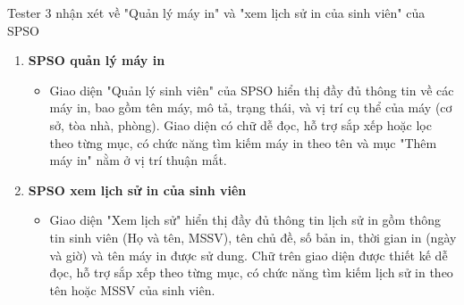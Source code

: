 \begin{itemize}
\begin{enumerate}
  \end{enumerate}
  Tester 3 nhận xét về "Quản lý máy in" và "xem lịch sử in của sinh viên" của SPSO \\
  \begin{enumerate}
      \item \textbf{SPSO quản lý máy in}
      \begin{itemize}
          \item Giao diện "Quản lý sinh viên" của SPSO hiển thị đầy đủ thông tin về các máy in, bao gồm tên máy, mô tả, trạng thái, và vị trí cụ thể của máy (cơ sở, tòa nhà, phòng). Giao diện có chữ dễ đọc, hỗ trợ sắp xếp hoặc lọc theo từng mục, có chức năng tìm kiếm máy in theo tên và mục "Thêm máy in" nằm ở vị trí thuận mắt.
      \end{itemize}
      
      \item \textbf{SPSO xem lịch sử in của sinh viên}
      \begin{itemize}
          \item Giao diện "Xem lịch sử" hiển thị đầy đủ thông tin lịch sử in gồm thông tin sinh viên (Họ và tên, MSSV), tên chủ đề, số bản in, thời gian in (ngày và giờ) và tên máy in được sử dung. Chữ trên giao diện được thiết kế dễ đọc, hỗ trợ sắp xếp theo từng mục, có chức năng tìm kiếm lịch sử in theo tên hoặc MSSV của sinh viên.
      \end{itemize}
  \end{enumerate}

\end{itemize}

